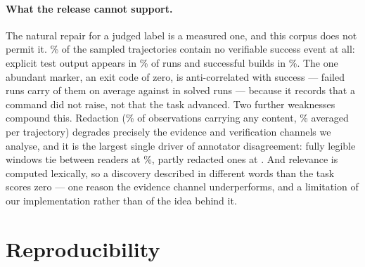 \paragraph{What the release cannot support.} The natural repair for a judged label is a measured one, and
this corpus does not permit it. \pprobeRunsNoEvent{}\% of the sampled trajectories contain no verifiable
success event at all: explicit test output appears in \pprobeRunsPytest{}\% of runs and successful builds
in \pprobeRunsBuild{}\%. The one abundant marker, an exit code of zero, is anti-correlated with success ---
failed runs carry \pprobeEventsFail{} of them on average against \pprobeEventsPass{} in solved runs ---
because it records that a command did not raise, not that the task advanced. Two further weaknesses
compound this. Redaction (\pcorpusRedactFrac{}\% of observations carrying any content,
\pcorpusRedactMean{}\% averaged per trajectory) degrades precisely the evidence and verification channels
we analyse, and it is the largest single driver of annotator disagreement: fully legible windows tie
between readers at \predactTieZero{}\%, partly redacted ones at \predactTieOne{}. And relevance is computed
lexically, so a discovery described in different words than the task scores zero --- one reason the
evidence channel underperforms, and a limitation of our implementation rather than of the idea behind it.

\section{Reproducibility}
\label{sec:repro}

